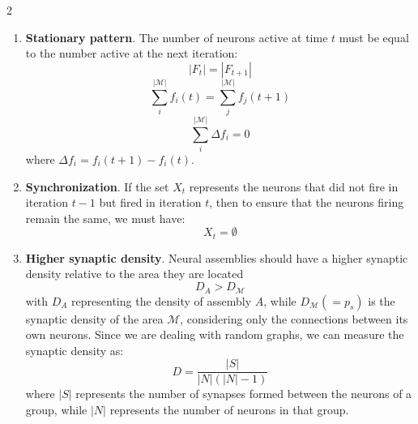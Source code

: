 \documentclass[a4paper, 10pt]{article}
\begin{document}
\begin{multicols}{2}
\begin{enumerate}
    \item[i)] {\bf Stationary pattern}. 
The number of neurons active at time $t$ must be equal to the number active at the next iteration: 
$$|F_t| = |F_{t+1}|$$
$$\sum_i^{|\mathcal{M}| } f_i(t) = \sum_j^{|\mathcal{M}| }f_j(t+1)$$
\begin{equation}\label{eq:stat}
    \sum_i^{|\mathcal{M}| } \Delta f_i = 0
\end{equation}
where $\Delta f_i = f_i(t+1) - f_i(t)$.

\item[ii)]{\bf Synchronization}.
If the set $X_{t}$ represents the neurons that did not fire in iteration $t-1$ but fired in iteration $t$, then to ensure that the neurons firing remain the same, we must have:
\begin{equation}\label{eq:sync}
    X_{t} = \emptyset
\end{equation}
\item[iii)]{\bf Higher synaptic density}. Neural assemblies should have a higher synaptic density relative to the area they are located
\begin{equation}
    D_{A} > D_{\mathcal{M}}
\end{equation}
with $D_{A}$ representing the density of assembly $A$, while $D_{\mathcal{M}}(= p_s)$ is the synaptic density of the area $\mathcal{M}$, considering only the connections between its own neurons. Since we are dealing with random graphs, we can measure the synaptic density as:
\begin{equation}
    D = \frac{|S|}{|N|(|N| - 1)}
\end{equation}
where $|S|$ represents the number of synapses formed between the neurons of a group, while $|N|$ represents the number of neurons in that group.
\end{enumerate}


\end{multicols}
\end{document}
